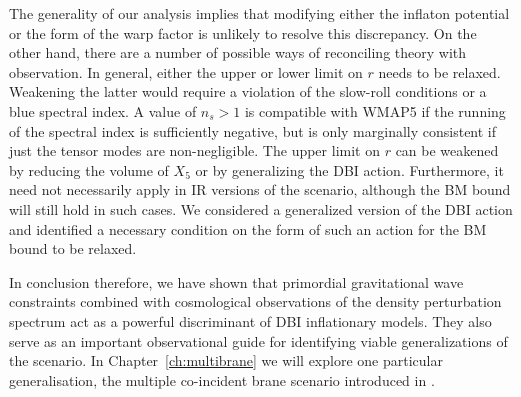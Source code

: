 The generality of our 
analysis implies that modifying either the inflaton potential 
or the form of the warp factor is unlikely to resolve this discrepancy. 
On the other hand, there are a number of possible ways of reconciling  
theory with observation. In general, 
either the upper or lower limit on $r$ needs to be relaxed. 
Weakening the latter would require a violation of the slow-roll 
conditions or a blue spectral index. 
A value of $n_s >1$ is compatible with WMAP5 if the running of the 
spectral index 
is sufficiently negative, but is only marginally
consistent if just the tensor modes are non-negligible.  The 
upper limit on $r$ can be weakened by reducing 
the volume of $X_5$ or 
by generalizing the DBI action. Furthermore, it need not necessarily 
apply in IR versions of the scenario, although the BM bound will still hold
in such cases. 
We considered a generalized version of the 
DBI action and identified a necessary condition on the form of such  
an action for the BM bound to be relaxed.






In conclusion therefore, we have shown that primordial gravitational wave constraints 
combined with cosmological observations of the density perturbation
spectrum act as a powerful discriminant of DBI inflationary models. 
They also serve as an important observational guide for identifying viable 
generalizations of the scenario. In Chapter~\ref{ch:multibrane} we will explore
one particular generalisation, the multiple co-incident brane scenario
introduced in .

